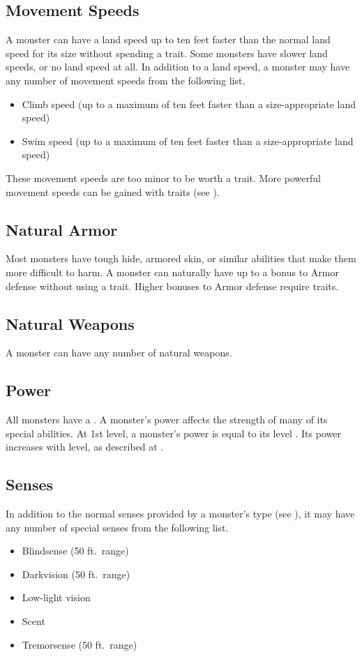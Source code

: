     \subsection{Movement Speeds}
        A monster can have a land speed up to ten feet faster than the normal land speed for its size without spending a trait.
        Some monsters have slower land speeds, or no land speed at all.
        In addition to a land speed, a monster may have any number of movement speeds from the following list.
        \begin{itemize}
            \item Climb speed (up to a maximum of ten feet faster than a size-appropriate land speed)
            \item Swim speed (up to a maximum of ten feet faster than a size-appropriate land speed)
        \end{itemize}

        These movement speeds are too minor to be worth a trait.
        More powerful movement speeds can be gained with traits (see ).

    \subsection{Natural Armor}
        Most monsters have tough hide, armored skin, or similar abilities that make them more difficult to harm.
        A monster can naturally have up to a  bonus to Armor defense without using a trait.
        Higher bonuses to Armor defense require traits.

    \subsection{Natural Weapons}
        A monster can have any number of natural weapons.

    \subsection{Power}\label{Power}
        All monsters have a .
        A monster's power affects the strength of many of its special abilities.
        At 1st level, a monster's power is equal to its level .
        Its power increases with level, as described at .

    \subsection{Senses}
        In addition to the normal senses provided by a monster's type (see ), it may have any number of special senses from the following list.
        \begin{itemize}
            \item Blindsense (50 ft.\ range)
            \item Darkvision (50 ft.\ range)
            \item Low-light vision
            \item Scent
            \item Tremorsense (50 ft.\ range)
        \end{itemize}

